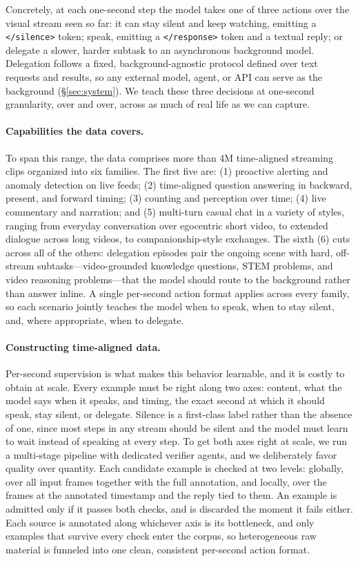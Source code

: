 \documentclass{llmxive}
\begin{document}
Concretely, at each one-second step the model takes one of three actions over the visual stream seen so far: it can stay silent and keep watching, emitting a \texttt{</silence>} token; speak, emitting a \texttt{</response>} token and a textual reply; or delegate a slower, harder subtask to an asynchronous background model. Delegation follows a fixed, background-agnostic protocol defined over text requests and results, so any external model, agent, or API can serve as the background (\S\ref{sec:system}). We teach these three decisions at one-second granularity, over and over, across as much of real life as we can capture.

\paragraph{\textbf{Capabilities the data covers.}}
To span this range, the data comprises more than 4M time-aligned streaming clips organized into six families. The first five are: (1) proactive alerting and anomaly detection on live feeds; (2) time-aligned question answering in backward, present, and forward timing; (3) counting and perception over time; (4) live commentary and narration; and (5) multi-turn casual chat in a variety of styles, ranging from everyday conversation over egocentric short video, to extended dialogue across long videos, to companionship-style exchanges. The sixth (6) cuts across all of the others: delegation episodes pair the ongoing scene with hard, off-stream subtasks—video-grounded knowledge questions, STEM problems, and video reasoning problems—that the model should route to the background rather than answer inline. A single per-second action format applies across every family, so each scenario jointly teaches the model when to speak, when to stay silent, and, where appropriate, when to delegate.

\paragraph{\textbf{Constructing time-aligned data.}}
Per-second supervision is what makes this behavior learnable, and it is costly to obtain at scale. Every example must be right along two axes: content, what the model says when it speaks, and timing, the exact second at which it should speak, stay silent, or delegate. Silence is a first-class label rather than the absence of one, since most steps in any stream should be silent and the model must learn to wait instead of speaking at every step. To get both axes right at scale, we run a multi-stage pipeline with dedicated verifier agents, and we deliberately favor quality over quantity. Each candidate example is checked at two levels: globally, over all input frames together with the full annotation, and locally, over the frames at the annotated timestamp and the reply tied to them. An example is admitted only if it passes both checks, and is discarded the moment it fails either. Each source is annotated along whichever axis is its bottleneck, and only examples that survive every check enter the corpus, so heterogeneous raw material is funneled into one clean, consistent per-second action format.
\end{document}
